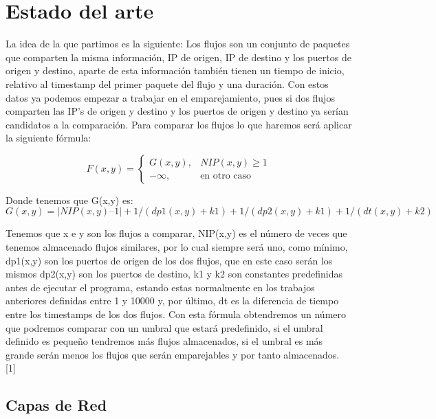 \chapter{Estado del arte}

La idea de la que partimos es la siguiente: 
Los flujos son un conjunto de paquetes que comparten la misma 
información, IP de origen, IP de destino y los puertos de origen 
y destino, aparte de esta información también tienen un tiempo de 
inicio, relativo al timestamp del primer paquete del flujo y una 
duración. Con estos datos ya podemos empezar a trabajar en el 
emparejamiento, pues si dos flujos comparten las IP’s de origen y 
destino y los puertos de origen y destino ya serían candidatos a 
la comparación. Para comparar los flujos lo que haremos será 
aplicar la siguiente fórmula:
\intro

\begin{equation*}
	F(x,y)=
 	\begin{cases}
	  G(x,y), & NIP(x,y) \geq 1 \\
	  -\infty, & \text{en otro caso}
	 \end{cases}
\end{equation*}

Donde tenemos que G(x,y) es:
\intro
\begin{displaymath}
G(x,y) = |NIP(x,y) – 1| + 1 / (dp1(x,y) + k1) + 1 / (dp2(x,y) + k1) + 1 / (dt(x,y) + k2)
\end{displaymath}

Tenemos que x e y son los flujos a comparar, NIP(x,y) es el número 
de veces que tenemos almacenado flujos similares, por lo cual siempre 
será uno, como mínimo, dp1(x,y) son los puertos de origen de los dos 
flujos, que en este caso serán los mismos dp2(x,y) son los puertos de 
destino, k1 y k2 son constantes predefinidas antes de ejecutar el programa, 
estando estas normalmente en los trabajos anteriores definidas entre 
1 y 10000 y, por último, dt es la diferencia de tiempo entre los timestamps 
de los dos flujos.  
\intro
Con esta fórmula obtendremos un número que podremos comparar con un 
umbral que estará predefinido, si el umbral definido es pequeño 
tendremos más flujos almacenados, si el umbral es más grande serán 
menos los flujos que serán emparejables y por tanto almacenados. [1]


\section{Capas de Red}

